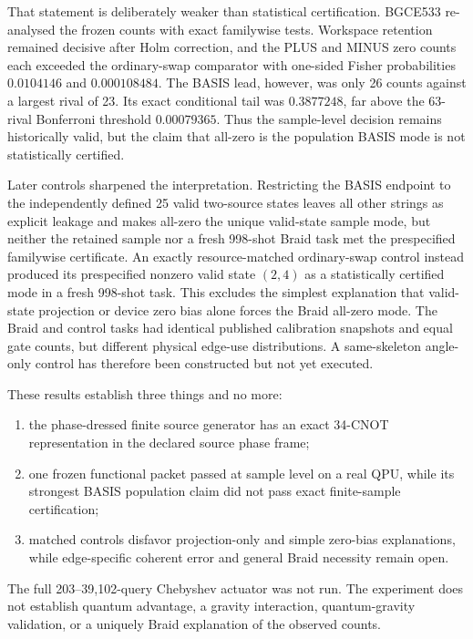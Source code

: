 \documentclass[11pt]{article}
\theoremstyle{definition}
\theoremstyle{remark}
\begin{document}
That statement is deliberately weaker than statistical certification. BGCE533 re-analysed the frozen counts with exact familywise tests. Workspace retention remained decisive after Holm correction, and the PLUS and MINUS zero counts each exceeded the ordinary-swap comparator with one-sided Fisher probabilities $0.0104146$ and $0.000108484$. The BASIS lead, however, was only 26 counts against a largest rival of 23. Its exact conditional tail was $0.3877248$, far above the 63-rival Bonferroni threshold $0.00079365$. Thus the sample-level decision remains historically valid, but the claim that all-zero is the population BASIS mode is not statistically certified.

Later controls sharpened the interpretation. Restricting the BASIS endpoint to the independently defined 25 valid two-source states leaves all other strings as explicit leakage and makes all-zero the unique valid-state sample mode, but neither the retained sample nor a fresh 998-shot Braid task met the prespecified familywise certificate. An exactly resource-matched ordinary-swap control instead produced its prespecified nonzero valid state $(2,4)$ as a statistically certified mode in a fresh 998-shot task. This excludes the simplest explanation that valid-state projection or device zero bias alone forces the Braid all-zero mode. The Braid and control tasks had identical published calibration snapshots and equal gate counts, but different physical edge-use distributions. A same-skeleton angle-only control has therefore been constructed but not yet executed.

These results establish three things and no more:
\begin{enumerate}
\item the phase-dressed finite source generator has an exact 34-CNOT representation in the declared source phase frame;
\item one frozen functional packet passed at sample level on a real QPU, while its strongest BASIS population claim did not pass exact finite-sample certification;
\item matched controls disfavor projection-only and simple zero-bias explanations, while edge-specific coherent error and general Braid necessity remain open.
\end{enumerate}
The full 203--39,102-query Chebyshev actuator was not run. The experiment does not establish quantum advantage, a gravity interaction, quantum-gravity validation, or a uniquely Braid explanation of the observed counts.
\end{document}
